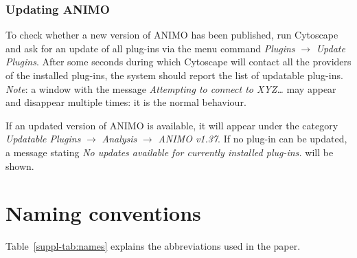 \subsubsection{Updating ANIMO}
To check whether a new version of ANIMO has been published, run Cytoscape and ask for an update of all
plug-ins via the menu command \emph{Plugins} $\rightarrow$ \emph{Update Plugins}. After some seconds
during which Cytoscape will contact all the providers of the installed plug-ins,
the system should report the list of updatable plug-ins.\\
\emph{Note}: a window with the message \emph{Attempting to connect to XYZ\dots} may appear and disappear multiple times:
it is the normal behaviour.

If an updated version of ANIMO is available, it will appear
under the category \emph{Updatable Plugins} $\rightarrow$
\emph{Analysis} $\rightarrow$ \emph{ANIMO v1.37}. If no plug-in can be updated, a message stating \emph{No
updates available for currently installed plug-ins.} will be shown.




\clearpage
\section{Naming conventions}\label{suppl-sec:names}
Table~\ref{suppl-tab:names} explains the abbreviations used in the paper.

